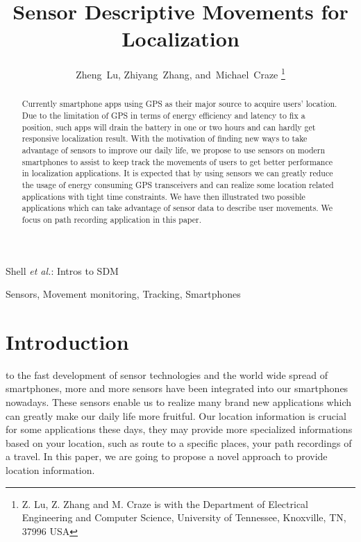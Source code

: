 \documentclass[journal]{IEEEtran}
\begin{document}
\title{Sensor Descriptive Movements for Localization}

\author{Zheng~Lu,
        Zhiyang~Zhang,
        and~Michael~Craze
\thanks{Z. Lu, Z. Zhang and M. Craze is with the Department
of Electrical Engineering and Computer Science, University of Tennessee, Knoxville,
TN, 37996 USA }} 

%
{Shell \MakeLowercase{\textit{et al.}}: Intros to SDM}


\maketitle

\begin{abstract}
Currently smartphone apps using GPS as their major source to acquire users' location. 
Due to the limitation of GPS in terms of energy efficiency and latency to fix a position, such apps will drain the battery in one or two hours and can hardly get responsive localization result. 
With the motivation of finding new ways to take advantage of sensors to improve our daily life, we propose to use sensors on modern smartphones to assist to keep track the movements of users to get better performance in localization applications. 
It is expected that by using sensors we can greatly reduce the usage of energy consuming GPS transceivers and can realize some location related applications with tight time constraints. 
We have then illustrated two possible applications which can take advantage of sensor data to describe user movements.
We focus on path recording application in this paper.
\end{abstract}

\begin{IEEEkeywords}
Sensors, Movement monitoring, Tracking, Smartphones
\end{IEEEkeywords}

\section{Introduction}
 to the fast development of sensor technologies and the world wide spread of smartphones, more and more sensors have been integrated into our smartphones nowadays. 
These sensors enable us to realize many brand new applications which can greatly make our daily life more fruitful. 
Our location information is crucial for some applications these days, they may provide more specialized informations based on your location, such as route to a specific places, your path recordings of a travel. 
In this paper, we are going to propose a novel approach to provide location information.
\end{document}
